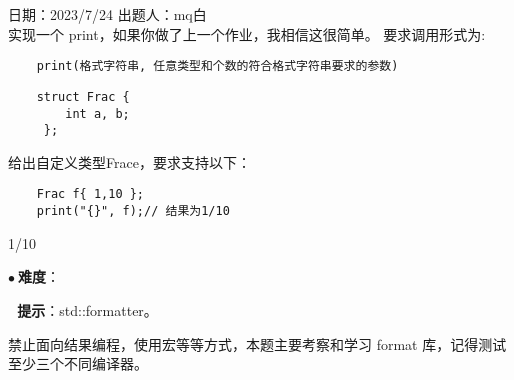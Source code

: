 日期：2023/7/24 出题人：mq白\\

实现一个 print，如果你做了上一个作业，我相信这很简单。 要求调用形式为:

\begin{verbatim}
    print(格式字符串, 任意类型和个数的符合格式字符串要求的参数)
\end{verbatim}

\begin{verbatim}
    struct Frac {
        int a, b;
     };
\end{verbatim}

给出自定义类型Frace，要求支持以下：

\begin{verbatim}
    Frac f{ 1,10 };
    print("{}", f);// 结果为1/10
\end{verbatim}

\begin{tcolorbox}[title = {要求运行结果},
    fonttitle = \bfseries, fontupper = \sffamily, fontlower = \itshape]
    1/10
\end{tcolorbox}

$\bullet ~ $\textbf{难度}：    

$~~~$\textbf{提示}：std::formatter。

禁止面向结果编程，使用宏等等方式，本题主要考察和学习 format 库，记得测试至少三个不同编译器。